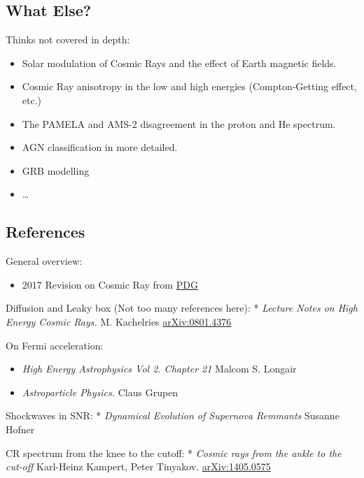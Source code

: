 \documentclass[
  letterpaper,
  DIV=11,
  numbers=noendperiod]{scrreprt}
\providecommand{\tightlist}{%
  \setlength{\itemsep}{0pt}\setlength{\parskip}{0pt}}\usepackage{longtable,booktabs,array}
\begin{document}
\subsection*{What Else?}\label{what-else}

Thinks not covered in depth:

\begin{itemize}
\tightlist
\item
  Solar modulation of Cosmic Rays and the effect of Earth magnetic
  fields.
\item
  Cosmic Ray anisotropy in the low and high energies (Compton-Getting
  effect, etc.)
\item
  The PAMELA and AMS-2 disagreement in the proton and He spectrum.
\item
  AGN classification in more detailed.
\item
  GRB modelling
\item
  \ldots{}
\end{itemize}

\subsection*{References}\label{references-1}

General overview:

\begin{itemize}
\tightlist
\item
  2017 Revision on Cosmic Ray from
  \href{http://pdg.lbl.gov/2017/reviews/rpp2017-rev-cosmic-rays.pdf}{PDG}
\end{itemize}

Diffusion and Leaky box (Not too many references here): * \emph{Lecture
Notes on High Energy Cosmic Rays.} M. Kachelries
\href{https://arxiv.org/abs/0801.4376}{arXiv:0801.4376}

On Fermi acceleration:

\begin{itemize}
\tightlist
\item
  \emph{High Energy Astrophysics Vol 2. Chapter 21} Malcom S. Longair
\item
  \emph{Astroparticle Physics.} Claus Grupen
\end{itemize}

Shockwaves in SNR: * \emph{Dynamical Evolution of Supernova Remmants}
Susanne Hofner

CR spectrum from the knee to the cutoff: * \emph{Cosmic rays from the
ankle to the cut-off} Karl-Heinz Kampert, Peter Tinyakov.
\href{https://arxiv.org/abs/1405.0575}{arXiv:1405.0575}
\end{document}
